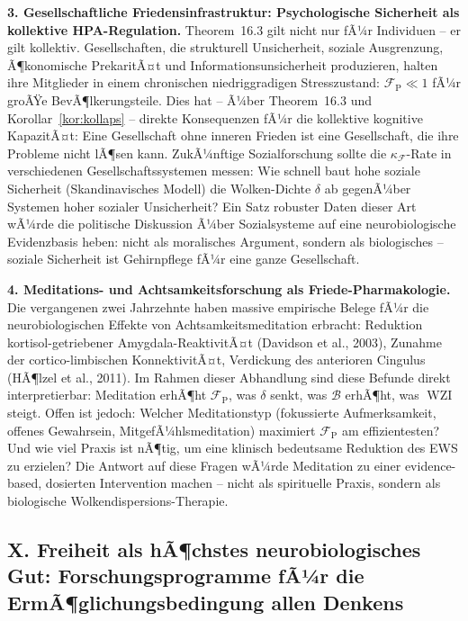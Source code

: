 ﻿\documentclass[12pt,a4paper]{report}
\theoremstyle{plain}
\theoremstyle{definition}
\theoremstyle{remark}
\DeclareMathOperator{\WZI}{WZI}
\begin{document}
	\textbf{3. Gesellschaftliche Friedensinfrastruktur: Psychologische
		Sicherheit als kollektive HPA-Regulation.}
	Theorem~16.3 gilt nicht nur fÃ¼r Individuen -- er gilt kollektiv.
	Gesellschaften, die strukturell Unsicherheit, soziale Ausgrenzung,
	Ã¶konomische PrekaritÃ¤t und Informationsunsicherheit produzieren,
	halten ihre Mitglieder in einem chronischen niedriggradigen
	Stresszustand: $\mathcal{F}_{\mathrm{P}} \ll 1$ fÃ¼r groÃŸe
	BevÃ¶lkerungsteile.
	Dies hat -- Ã¼ber Theorem~16.3 und Korollar~\ref{kor:kollaps} --
	direkte Konsequenzen fÃ¼r die kollektive kognitive KapazitÃ¤t:
	Eine Gesellschaft ohne inneren Frieden ist eine Gesellschaft,
	die ihre Probleme nicht lÃ¶sen kann.
	ZukÃ¼nftige Sozialforschung sollte die $\kappa_\mathcal{F}$-Rate
	in verschiedenen Gesellschaftssystemen messen:
	Wie schnell baut hohe soziale Sicherheit (Skandinavisches Modell)
	die Wolken-Dichte $\delta$ ab gegenÃ¼ber Systemen hoher sozialer
	Unsicherheit?
	Ein Satz robuster Daten dieser Art wÃ¼rde die politische Diskussion
	Ã¼ber Sozialsysteme auf eine neurobiologische Evidenzbasis heben:
	nicht als moralisches Argument, sondern als biologisches --
	soziale Sicherheit ist Gehirnpflege fÃ¼r eine ganze Gesellschaft.

	\textbf{4. Meditations- und Achtsamkeitsforschung als Friede-Pharmakologie.}
	Die vergangenen zwei Jahrzehnte haben massive empirische Belege
	fÃ¼r die neurobiologischen Effekte von Achtsamkeitsmeditation
	erbracht: Reduktion kortisol-getriebener Amygdala-ReaktivitÃ¤t
	(Davidson et al., 2003), Zunahme der cortico-limbischen
	KonnektivitÃ¤t, Verdickung des anterioren Cingulus
	(HÃ¶lzel et al., 2011).
	Im Rahmen dieser Abhandlung sind diese Befunde direkt
	interpretierbar: Meditation erhÃ¶ht $\mathcal{F}_{\mathrm{P}}$,
	was $\delta$ senkt, was $\mathcal{B}$ erhÃ¶ht, was $\WZI$ steigt.
	Offen ist jedoch: Welcher Meditationstyp (fokussierte
	Aufmerksamkeit, offenes Gewahrsein, MitgefÃ¼hlsmeditation)
	maximiert $\mathcal{F}_{\mathrm{P}}$ am effizientesten?
	Und wie viel Praxis ist nÃ¶tig, um eine klinisch bedeutsame
	Reduktion des EWS zu erzielen?
	Die Antwort auf diese Fragen wÃ¼rde Meditation zu einer
	evidence-based, dosierten Intervention machen --
	nicht als spirituelle Praxis, sondern als biologische
	Wolkendispersions-Therapie.

	\subsection*{X. Freiheit als hÃ¶chstes neurobiologisches Gut:
		Forschungsprogramme fÃ¼r die ErmÃ¶glichungsbedingung allen Denkens}
\end{document}
